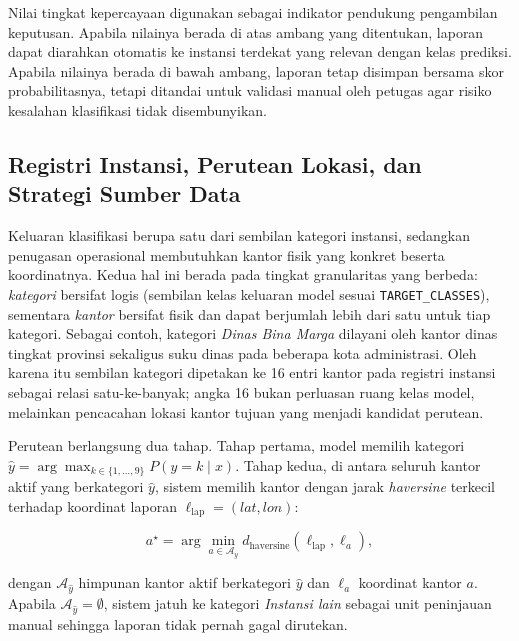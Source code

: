 Nilai tingkat kepercayaan digunakan sebagai indikator pendukung pengambilan keputusan. Apabila nilainya berada di atas ambang yang ditentukan, laporan dapat diarahkan otomatis ke instansi terdekat yang relevan dengan kelas prediksi. Apabila nilainya berada di bawah ambang, laporan tetap disimpan bersama skor probabilitasnya, tetapi ditandai untuk validasi manual oleh petugas agar risiko kesalahan klasifikasi tidak disembunyikan.

\subsection{Registri Instansi, Perutean Lokasi, dan Strategi Sumber Data}
\label{subsec:registri-instansi}

Keluaran klasifikasi berupa satu dari sembilan kategori instansi, sedangkan penugasan operasional membutuhkan kantor fisik yang konkret beserta koordinatnya. Kedua hal ini berada pada tingkat granularitas yang berbeda: \emph{kategori} bersifat logis (sembilan kelas keluaran model sesuai \texttt{TARGET\_CLASSES}), sementara \emph{kantor} bersifat fisik dan dapat berjumlah lebih dari satu untuk tiap kategori. Sebagai contoh, kategori \textit{Dinas Bina Marga} dilayani oleh kantor dinas tingkat provinsi sekaligus suku dinas pada beberapa kota administrasi. Oleh karena itu sembilan kategori dipetakan ke 16 entri kantor pada registri instansi sebagai relasi satu-ke-banyak; angka 16 bukan perluasan ruang kelas model, melainkan pencacahan lokasi kantor tujuan yang menjadi kandidat perutean.

Perutean berlangsung dua tahap. Tahap pertama, model memilih kategori \(\hat{y} = \arg\max_{k \in \{1,\dots,9\}} P(y = k \mid x)\). Tahap kedua, di antara seluruh kantor aktif yang berkategori \(\hat{y}\), sistem memilih kantor dengan jarak \textit{haversine} terkecil terhadap koordinat laporan \(\ell_{\text{lap}} = (\textit{lat}, \textit{lon})\):

\begin{equation}
    a^{\star} = \arg\min_{a \in \mathcal{A}_{\hat{y}}} d_{\text{haversine}}\!\left(\ell_{\text{lap}}, \ell_a\right),
    \label{eq:nearest-agency}
\end{equation}

\noindent dengan \(\mathcal{A}_{\hat{y}}\) himpunan kantor aktif berkategori \(\hat{y}\) dan \(\ell_a\) koordinat kantor \(a\). Apabila \(\mathcal{A}_{\hat{y}} = \emptyset\), sistem jatuh ke kategori \textit{Instansi lain} sebagai unit peninjauan manual sehingga laporan tidak pernah gagal dirutekan.

